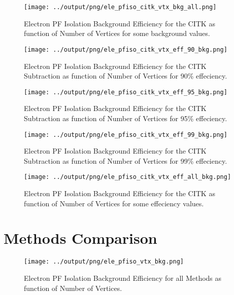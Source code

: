 \documentclass[11pt]{book}
\begin{document}
\begin{figure}[htb]
\centering
\texttt{[image: ../output/png/ele\_pfiso\_citk\_vtx\_bkg\_all.png]}
\caption{Electron PF Isolation Background Efficiency for the CITK as function of Number of Vertices for some background values.}
\label{fig:ele_pfiso_vtx_bkg_citk_bkg_all}
\end{figure}

\begin{figure}[htb]
\centering
\texttt{[image: ../output/png/ele\_pfiso\_citk\_vtx\_eff\_90\_bkg.png]}
\caption{Electron PF Isolation Background Efficiency for the CITK Subtraction as function of Number of Vertices for 90\% effeciency.}
\label{fig:ele_pfiso_vtx_eff_citk_eff_90_bkg}
\end{figure}

\begin{figure}[htb]
\centering
\texttt{[image: ../output/png/ele\_pfiso\_citk\_vtx\_eff\_95\_bkg.png]}
\caption{Electron PF Isolation Background Efficiency for the CITK Subtraction as function of Number of Vertices for 95\% effeciency.}
\label{fig:ele_pfiso_vtx_eff_citk_eff_95_bkg}
\end{figure}

\begin{figure}[htb]
\centering
\texttt{[image: ../output/png/ele\_pfiso\_citk\_vtx\_eff\_99\_bkg.png]}
\caption{Electron PF Isolation Background Efficiency for the CITK Subtraction as function of Number of Vertices for 99\% effeciency.}
\label{fig:ele_pfiso_vtx_eff_citk_eff_99_bkg}
\end{figure}

\begin{figure}[htb]
\centering
\texttt{[image: ../output/png/ele\_pfiso\_citk\_vtx\_eff\_all\_bkg.png]}
\caption{Electron PF Isolation Background Efficiency for the CITK as function of Number of Vertices for some effeciency values.}
\label{fig:ele_pfiso_vtx_eff_citk_eff_all_bkg}
\end{figure}
\clearpage

\section{Methods Comparison}
\begin{figure}[htb]
\centering
\texttt{[image: ../output/png/ele\_pfiso\_vtx\_bkg.png]}
\caption{Electron PF Isolation Background Efficiency for all Methods as function of Number of Vertices.}
\label{fig:ele_pfiso_vtx_bkg}
\end{figure}
\end{document}
